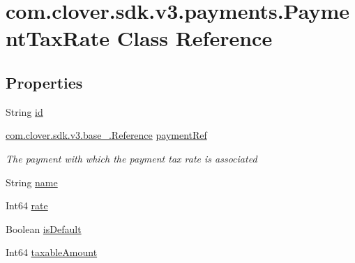 \hypertarget{classcom_1_1clover_1_1sdk_1_1v3_1_1payments_1_1_payment_tax_rate}{}\section{com.\+clover.\+sdk.\+v3.\+payments.\+Payment\+Tax\+Rate Class Reference}
\label{classcom_1_1clover_1_1sdk_1_1v3_1_1payments_1_1_payment_tax_rate}
\subsection*{Properties}
\begin{DoxyCompactItemize}
\item 
String \hyperlink{classcom_1_1clover_1_1sdk_1_1v3_1_1payments_1_1_payment_tax_rate_a06f1f9fc8c88196ee1f0ee8ca29dbbda}{id}
\item 
\hyperlink{classcom_1_1clover_1_1sdk_1_1v3_1_1base___1_1_reference}{com.\+clover.\+sdk.\+v3.\+base\+\_\+.\+Reference} \hyperlink{classcom_1_1clover_1_1sdk_1_1v3_1_1payments_1_1_payment_tax_rate_a8071470577ecf642ac8aefe86e9f4ad6}{payment\+Ref}
\begin{DoxyCompactList}\small\item\em The payment with which the payment tax rate is associated \end{DoxyCompactList}\item 
String \hyperlink{classcom_1_1clover_1_1sdk_1_1v3_1_1payments_1_1_payment_tax_rate_a99d17d8c96f5f05749775317b1a269ca}{name}
\item 
Int64 \hyperlink{classcom_1_1clover_1_1sdk_1_1v3_1_1payments_1_1_payment_tax_rate_abf291d4f05f8169e2b07edce2eb5ab25}{rate}
\item 
Boolean \hyperlink{classcom_1_1clover_1_1sdk_1_1v3_1_1payments_1_1_payment_tax_rate_abdd1607b2b38b407423e987c8b22b73d}{is\+Default}
\item 
Int64 \hyperlink{classcom_1_1clover_1_1sdk_1_1v3_1_1payments_1_1_payment_tax_rate_a8ff57f64008115b286cfe5c17621f23a}{taxable\+Amount}
\end{DoxyCompactItemize}


